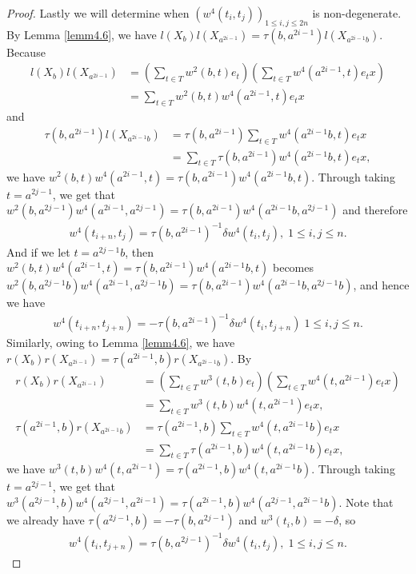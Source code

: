 \documentclass[a4paper,11pt]{amsart}
\numberwithin{equation}{section}
\begin{document}
\begin{proof}
Lastly we will determine when $(w^4(t_i,t_j))_{1\leq i,j \leq 2n}$ is non-degenerate. By Lemma \ref{lemm4.6}, we have $l(X_b)l(X_{a^{2i-1}})=\tau(b,a^{2i-1}) l(X_{a^{2i-1}b})$. Because
\begin{align*}
l(X_b)l(X_{a^{2i-1}})&=(\sum_{t\in T} w^2(b,t)e_t) (\sum_{t\in T} w^4(a^{2i-1},t)e_t x)\\
&=\sum_{t\in T} w^2(b,t)w^4(a^{2i-1},t)e_t x
\end{align*}
and
\begin{align*}
\tau(b,a^{2i-1}) l(X_{a^{2i-1}b})&=\tau(b,a^{2i-1})\sum_{t\in T} w^4(a^{2i-1}b,t)e_t x\\
&=\sum_{t\in T}\tau(b,a^{2i-1}) w^4(a^{2i-1}b,t)e_t x,
\end{align*}
we have $w^2(b,t)w^4(a^{2i-1},t)=\tau(b,a^{2i-1}) w^4(a^{2i-1}b,t)$. Through taking $t=a^{2j-1}$, we get that $w^2(b,a^{2j-1})w^4(a^{2i-1},a^{2j-1})=\tau(b,a^{2i-1}) w^4(a^{2i-1}b,a^{2j-1})$ and therefore
\begin{align}
\label{w4non-deg1} w^4(t_{i+n},t_j)=\tau(b,a^{2i-1})^{-1} \delta w^4(t_i,t_j),\;1 \leq i,j \leq n.
\end{align}
And if we let $t=a^{2j-1}b$, then $w^2(b,t)w^4(a^{2i-1},t)=\tau(b,a^{2i-1}) w^4(a^{2i-1}b,t)$ becomes $w^2(b,a^{2j-1}b)w^4(a^{2i-1},a^{2j-1}b)=\tau(b,a^{2i-1}) w^4(a^{2i-1}b,a^{2j-1}b)$, and hence we have
\begin{align}
\label{w4non-deg2} w^4(t_{i+n},t_{j+n})=-\tau(b,a^{2i-1})^{-1} \delta w^4(t_i,t_{j+n})\;1 \leq i,j \leq n.
\end{align}
Similarly, owing to Lemma \ref{lemm4.6}, we have $r(X_b)r(X_{a^{2i-1}})=\tau(a^{2i-1},b) r(X_{a^{2i-1}b})$. By
\begin{align*}
r(X_b)r(X_{a^{2i-1}})&=(\sum_{t\in T} w^3(t,b)e_t) (\sum_{t\in T} w^4(t,a^{2i-1})e_t x)\\
&=\sum_{t\in T} w^3(t,b)w^4(t,a^{2i-1})e_t x,\\
\tau(a^{2i-1},b) r(X_{a^{2i-1}b})&=\tau(a^{2i-1},b)\sum_{t\in T} w^4(t,a^{2i-1}b)e_t x\\
&=\sum_{t\in T}\tau(a^{2i-1},b) w^4(t,a^{2i-1}b)e_t x,
\end{align*}
we have $w^3(t,b)w^4(t,a^{2i-1})=\tau(a^{2i-1},b) w^4(t,a^{2i-1}b)$. Through taking $t=a^{2j-1}$, we get that $w^3(a^{2j-1},b)w^4(a^{2j-1},a^{2i-1})=\tau(a^{2i-1},b) w^4(a^{2j-1},a^{2i-1}b)$. Note that we already have $\tau(a^{2j-1},b)=-\tau(b,a^{2j-1})$ and $w^3(t_i,b)=-\delta$, so
\begin{align}
\label{w4non-deg3} w^4(t_{i},t_{j+n})=\tau(b,a^{2j-1})^{-1} \delta w^4(t_i,t_j),\;1 \leq i,j \leq n.

\end{align}
\end{proof}
\end{document}
